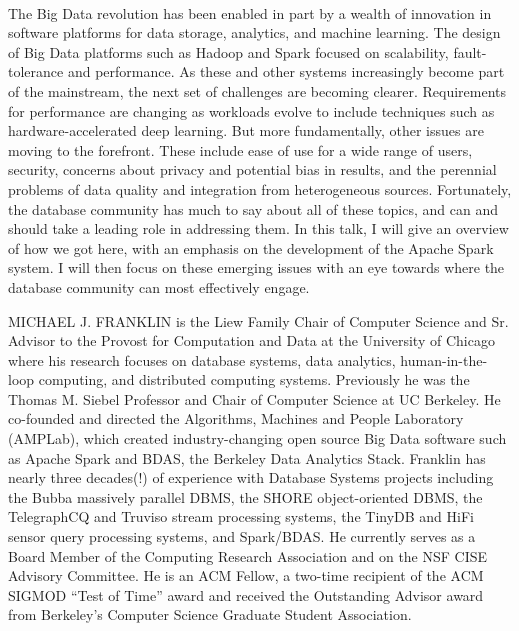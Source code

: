
\\

\sessionsep{}

The Big Data revolution has been enabled in part by a wealth of innovation in software platforms for data storage, analytics, and machine learning.  The design of Big Data platforms such as Hadoop and Spark focused on scalability, fault-tolerance and performance.  As these and other systems increasingly become part of the mainstream, the next set of challenges are becoming clearer.  Requirements for performance are changing as workloads evolve to include techniques such as hardware-accelerated deep learning. But more fundamentally, other issues are moving to the forefront.  These include ease of use for a wide range of users, security, concerns about privacy and potential bias in results, and the perennial problems of data quality and integration from heterogeneous sources. Fortunately, the database community has much to say about all of these topics, and can and should take a leading role in addressing them. In this talk, I will give an overview of how we got here, with an emphasis on the development of the Apache Spark system. I will then focus on these emerging issues with an eye towards where the database community can most effectively engage.

MICHAEL J. FRANKLIN is the Liew Family Chair of Computer Science and Sr. Advisor to the Provost for Computation and Data at the University of Chicago where his research focuses on database systems, data analytics, human-in-the-loop computing, and distributed computing systems.  Previously he was the Thomas M. Siebel Professor and Chair of Computer Science at UC Berkeley.   He co-founded and directed the Algorithms, Machines and People Laboratory (AMPLab), which created industry-changing open source Big Data software such as Apache Spark and BDAS, the Berkeley Data Analytics Stack. Franklin has nearly three decades(!) of experience with Database Systems projects including the Bubba massively parallel DBMS, the SHORE object-oriented DBMS, the TelegraphCQ and Truviso stream processing systems, the TinyDB and HiFi sensor query processing systems, and Spark/BDAS.  He currently serves as a Board Member of the Computing Research Association and on the NSF CISE Advisory Committee.  He is an ACM Fellow, a two-time recipient of the ACM SIGMOD “Test of Time” award and received the Outstanding Advisor award from Berkeley’s Computer Science Graduate Student Association.

